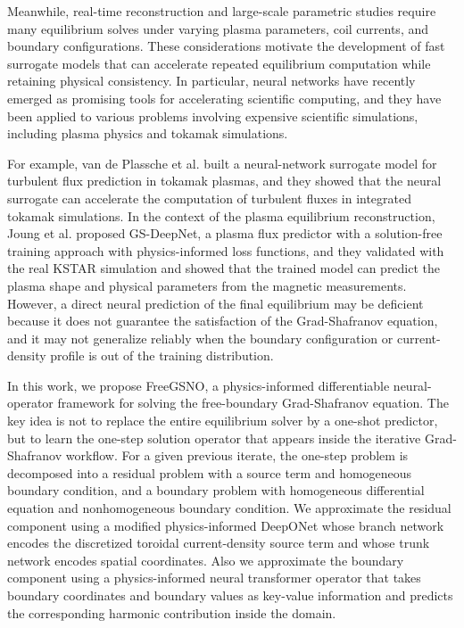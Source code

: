 Meanwhile, real-time reconstruction and large-scale parametric studies require many 
equilibrium solves under varying plasma parameters, coil currents, and boundary configurations.
These considerations motivate the development of fast surrogate models 
that can accelerate repeated equilibrium computation while retaining physical consistency.
In particular, neural networks have recently emerged as 
promising tools for accelerating scientific computing, \cite{deeponetspeedup}
and they have been applied to various problems involving expensive scientific
simulations, including plasma physics and tokamak simulations.

For example, van de Plassche et al. \cite{turbulent} built a neural-network surrogate model 
for turbulent flux prediction in tokamak plasmas, and they showed that the neural surrogate 
can accelerate the computation of turbulent fluxes in integrated tokamak simulations.
In the context of the plasma equilibrium reconstruction, Joung et al. \cite{gsdeepnet}
proposed GS-DeepNet, a plasma flux predictor with
a solution-free training approach with physics-informed loss functions, 
and they validated with the real KSTAR simulation and showed that the trained model 
can predict the plasma shape and physical parameters from the magnetic measurements.
However, a direct neural prediction of the final equilibrium may be deficient
because it does not guarantee the satisfaction of the Grad-Shafranov equation,
and it may not generalize reliably when the boundary configuration 
or current-density profile is out of the training distribution. 

In this work, we propose FreeGSNO, a physics-informed differentiable neural-operator framework 
for solving the free-boundary Grad-Shafranov equation. 
The key idea is not to replace the entire equilibrium solver by a one-shot predictor, 
but to learn the one-step solution operator that appears inside the 
iterative Grad-Shafranov workflow. 
For a given previous iterate, the one-step problem is decomposed into 
a residual problem with a source term and homogeneous boundary condition, 
and a boundary problem with homogeneous differential equation and 
nonhomogeneous boundary condition. 
We approximate the residual component using a modified physics-informed DeepONet 
whose branch network encodes the discretized toroidal current-density source term 
and whose trunk network encodes spatial coordinates. 
Also we approximate the boundary component using a physics-informed 
neural transformer operator that takes boundary coordinates and boundary values 
as key-value information and predicts the corresponding harmonic contribution inside the domain.

